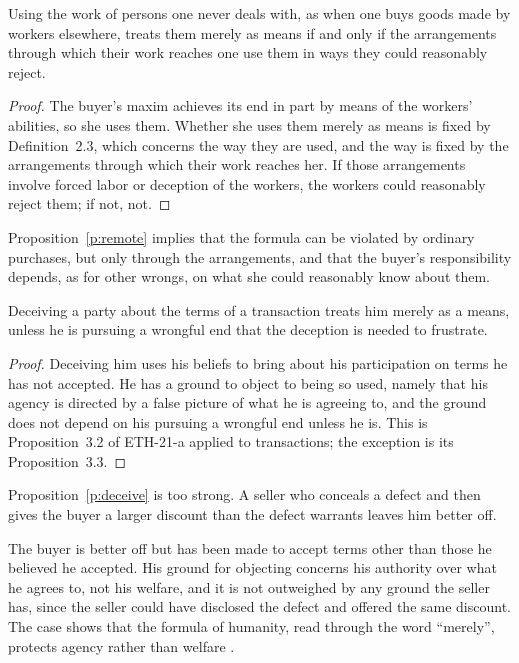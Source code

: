 \documentclass{situationist-preprint}
\begin{document}
\begin{proposition}\label{p:remote}
Using the work of persons one never deals with, as when one buys goods made by workers elsewhere, treats them merely as means if and only if the arrangements through which their work reaches one use them in ways they could reasonably reject.
\end{proposition}

\begin{proof}
The buyer's maxim achieves its end in part by means of the workers' abilities, so she uses them. Whether she uses them merely as means is fixed by Definition~2.3, which concerns the way they are used, and the way is fixed by the arrangements through which their work reaches her. If those arrangements involve forced labor or deception of the workers, the workers could reasonably reject them; if not, not.
\end{proof}

Proposition~\ref{p:remote} implies that the formula can be violated by ordinary purchases, but only through the arrangements, and that the buyer's responsibility depends, as for other wrongs, on what she could reasonably know about them.

\begin{proposition}[Deception]\label{p:deceive}
Deceiving a party about the terms of a transaction treats him merely as a means, unless he is pursuing a wrongful end that the deception is needed to frustrate.
\end{proposition}

\begin{proof}
Deceiving him uses his beliefs to bring about his participation on terms he has not accepted. He has a ground to object to being so used, namely that his agency is directed by a false picture of what he is agreeing to, and the ground does not depend on his pursuing a wrongful end unless he is. This is Proposition~3.2 of ETH-21-a applied to transactions; the exception is its Proposition~3.3.
\end{proof}

\begin{objection}
Proposition~\ref{p:deceive} is too strong. A seller who conceals a defect and then gives the buyer a larger discount than the defect warrants leaves him better off.
\end{objection}

\begin{reply}
The buyer is better off but has been made to accept terms other than those he believed he accepted. His ground for objecting concerns his authority over what he agrees to, not his welfare, and it is not outweighed by any ground the seller has, since the seller could have disclosed the defect and offered the same discount. The case shows that the formula of humanity, read through the word \enquote{merely}, protects agency rather than welfare \citep[4:429--430]{Kant1785}.
\end{reply}
\end{document}
